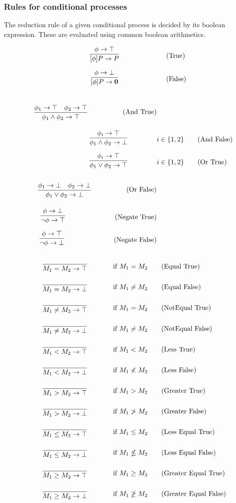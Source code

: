 \FloatBarrier

\subsubsection{Rules for conditional processes}
The reduction rule of a given conditional process is decided by its boolean expression. These are evaluated using common boolean arithmetics.

\begin{align}
	& \infrule{\phi \ra \top}{[\phi]P\ra P} \tag{True}\\
	& \infrule{\phi \ra \bot}{[\phi]P\ra \nil} \tag{False}
\end{align}

\begin{align*}
\infrule{\phi_1 \ra \top \quad \phi_2 \ra \top}{\phi_1 \wedge \phi_2 \ra \top}\tag{And True}\\
\infrule{\phi_i \ra \top}{\phi_1 \wedge \phi_2 \ra \bot} &i\in \{1,2\}\tag{And False}\\
\infrule{\phi_i \ra \top}{\phi_1 \vee \phi_2 \ra \top} &i\in \{1,2\} \tag{Or True}\\
\infrule{\phi_1 \ra \bot \quad \phi_2 \ra \bot}{\phi_1 \vee \phi_2 \ra \bot} \tag{Or False}\\
\infrule{\phi \ra \bot}{\neg\phi \ra \top} \tag{Negate True}\\
\infrule{\phi \ra \top}{\neg\phi \ra \bot} \tag{Negate False}\\
\end{align*}

\begin{align*}
\infrule{}{M_1 = M_2 \ra \top}& \text{if }M_1=M_2 \tag{Equal True}\\
\infrule{}{M_1 = M_2 \ra \bot}& \text{if }M_1\neq M_2 \tag{Equal False}\\
\infrule{}{M_1 \neq M_2 \ra \top}& \text{if }M_1=M_2 \tag{NotEqual True}\\
\infrule{}{M_1 \neq M_2 \ra \bot}& \text{if }M_1\neq M_2 \tag{NotEqual False}\\
\infrule{}{M_1 < M_2 \ra \top}& \text{if }M_1<M_2 \tag{Less True}\\
\infrule{}{M_1 < M_2 \ra \bot}& \text{if }M_1\nless M_2 \tag{Less False}\\
\infrule{}{M_1 > M_2 \ra \top}& \text{if }M_1>M_2 \tag{Greater True}\\
\infrule{}{M_1 > M_2 \ra \bot}& \text{if }M_1\ngtr M_2 \tag{Greater False}\\
\infrule{}{M_1 \leq M_2 \ra \top}& \text{if }M_1\leq M_2 \tag{Less Equal True}\\
\infrule{}{M_1 \leq M_2 \ra \bot}& \text{if }M_1\nleq M_2 \tag{Less Equal False}\\
\infrule{}{M_1 \geq M_2 \ra \top}& \text{if }M_1\geq M_2 \tag{Greater Equal True}\\
\infrule{}{M_1 \geq M_2 \ra \bot}& \text{if }M_1\ngeq M_2 \tag{Greater Equal False}
\end{align*}
	

\FloatBarrier



